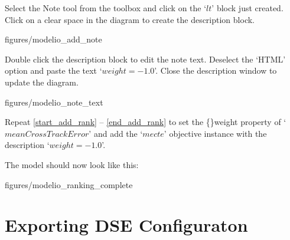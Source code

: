 \documentclass[11pt,a4paper]{../tutorial}
\begin{document}
\begin{instructions}
\newpage

\item Select the Note tool from the toolbox and click on the `$lt$' block just created. Click on a clear space in the diagram to create the description block.

\begin{center}
\begin{annotation}[width=0.7\linewidth]{figures/modelio_add_note}
    \end{annotation}
\end{center}

\newpage

\item \label{end_add_rank} Double click the description block to edit the note text. Deselect the `HTML' option and paste the text \mbox{`$weight = -1.0$'}. Close the description window to update the diagram.

\begin{center}
\begin{annotation}[width=0.7\linewidth]{figures/modelio_note_text}
    \end{annotation}
\end{center}

\item Repeat \ref{start_add_rank} -- \ref{end_add_rank} to set the \{\}weight property of `$meanCrossTrackError$' and add the `$mecte$' objective instance with the description \mbox{`$weight = -1.0$'}.

The model should now look like this:

\begin{center}
\begin{annotation}[width=0.7\linewidth]{figures/modelio_ranking_complete}
    \end{annotation}
\end{center}


\end{instructions}

\newpage

\section{Exporting DSE Configuraton}
\end{document}
